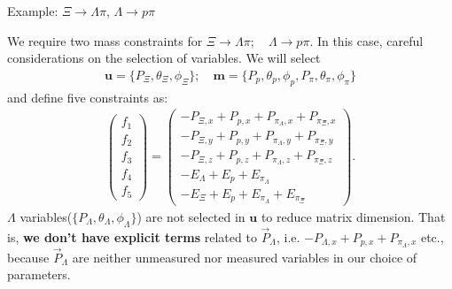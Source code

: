 \documentclass[
	xcolor=dvipsnames,
	aspectratio=169,	
	10pt, 
	]{beamer}
\begin{document}
\begin{frame}{Example: $\Xi\to \Lambda\pi$, $\Lambda\to p\pi$}
	\begin{block}{}
		We require two mass constraints for $\Xi\to \Lambda\pi;\quad \Lambda\to p\pi$. In this case, careful considerations on the selection of variables. We will select
		\begin{align}
			\mathbf{u} = \{P_\Xi,\theta_\Xi,\phi_\Xi\};\quad \mathbf{m}=\{P_p,\theta_p,\phi_p,P_\pi,\theta_\pi,\phi_\pi\}
		\end{align}
		and define five constraints as:
		\begin{align}
			\begin{pmatrix}
				f_1\\f_2\\f_3\\f_4\\f_5
			\end{pmatrix}=
			\begin{pmatrix}
				-P_{\Xi,x}+P_{p,x}+P_{{\pi_\Lambda},x}+P_{{\pi_\Xi},x}\\
				-P_{\Xi,y}+P_{p,y}+P_{{\pi_\Lambda},y}+P_{{\pi_\Xi},y}\\
				-P_{\Xi,z}+P_{p,z}+P_{{\pi_\Lambda},z}+P_{{\pi_\Xi},z}\\
				-E_\Lambda +E_p+E_{\pi_\Lambda}\\
				-E_\Xi +E_p+E_{\pi_\Lambda}+E_{\pi_\Xi}
			\end{pmatrix}.
		\end{align}
			$\Lambda$ variables($\{P_\Lambda,\theta_\Lambda,\phi_\Lambda\}$) are not selected in $\mathbf u$ to reduce matrix dimension.
			That is, \textbf{we don't have explicit terms} related to $\vec P_\Lambda$, i.e.  $-P_{\Lambda,x}+P_{p,x}+P_{{\pi_\Lambda},x}$ etc., because $\vec P_\Lambda$ are neither unmeasured nor measured variables in our choice of parameters.  
	\end{block}
\end{frame}
\end{document}
